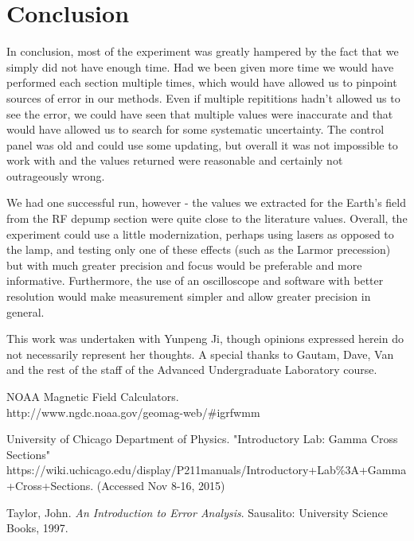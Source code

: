 \documentclass{article}
\begin{document}
\section{Conclusion}%
  In conclusion, most of the experiment was greatly hampered by the fact that we simply did not have enough time.  Had we been given more time we would have performed each section multiple times, which would have allowed us to pinpoint sources of error in our methods.  Even if multiple repititions hadn't allowed us to see the error, we could have seen that multiple values were inaccurate and that would have allowed us to search for some systematic uncertainty.  The control panel was old and could use some updating, but overall it was not impossible to work with and the values returned were reasonable and certainly not outrageously wrong.

  \hspace{.25cm}

  We had one successful run, however - the values we extracted for the Earth's field from the RF depump section were quite close to the literature values.  Overall, the experiment could use a little modernization, perhaps using lasers as opposed to the lamp, and testing only one of these effects (such as the Larmor precession) but with much greater precision and focus would be preferable and more informative.  Furthermore, the use of an oscilloscope and software with better resolution would make measurement simpler and allow greater precision in general.

  \hspace{.25cm}

  This work was undertaken with Yunpeng Ji, though opinions expressed herein do not necessarily represent her thoughts.  A special thanks to Gautam, Dave, Van and the rest of the staff of the Advanced Undergraduate Laboratory course.
\begin{thebibliography}{10}
    NOAA Magnetic Field Calculators. \\ http://www.ngdc.noaa.gov/geomag-web/\#igrfwmm

  	University of Chicago Department of Physics. "Introductory Lab: Gamma Cross Sections"\\
  	https://wiki.uchicago.edu/display/P211manuals/Introductory+Lab\%3A+Gamma+Cross+Sections. (Accessed Nov 8-16, 2015)

  	Taylor, John. \emph{An Introduction to Error Analysis}. Sausalito: University Science Books, 1997.
\end{thebibliography}
\end{document}
